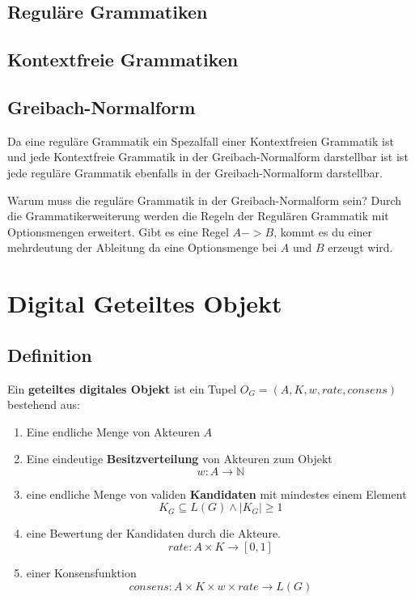 \documentclass[]{article}
\begin{document}
\subsection*{Reguläre Grammatiken}
\subsection*{Kontextfreie Grammatiken}
\subsection*{Greibach-Normalform}
Da eine reguläre Grammatik ein Spezalfall einer Kontextfreien Grammatik ist und jede Kontextfreie Grammatik in der Greibach-Normalform darstellbar ist ist jede reguläre Grammatik ebenfalls in der Greibach-Normalform darstellbar.

Warum muss die reguläre Grammatik in der Greibach-Normalform sein?
Durch die Grammatikerweiterung werden die Regeln der Regulären Grammatik mit Optionsmengen erweitert. Gibt es eine Regel $A->B$, kommt es du einer mehrdeutung der Ableitung da eine Optionsmenge bei $A$ und $B$ erzeugt wird.






\newpage
\section{Digital Geteiltes Objekt}
\subsection{Definition}

Ein \textbf{geteiltes digitales Objekt} ist ein Tupel $O_G=(A, K, w, rate, consens)$ bestehend aus:

\begin{enumerate}
\item Eine endliche Menge von Akteuren $A$
\item Eine eindeutige \textbf{Besitzverteilung} von Akteuren zum Objekt
  \[w: A \rightarrow \mathbb{N}\]
\item eine endliche Menge von validen \textbf{Kandidaten} mit mindestes einem Element 
  \[K_G \subseteq L(G) \land |K_G| \geq 1\] 
\item eine Bewertung der Kandidaten durch die Akteure. 
  \[rate: A\times K \rightarrow [0,1]\]
\item einer Konsensfunktion
  \[consens: A\times K\times w \times rate \rightarrow L(G)\] 
\end{enumerate}
\end{document}
